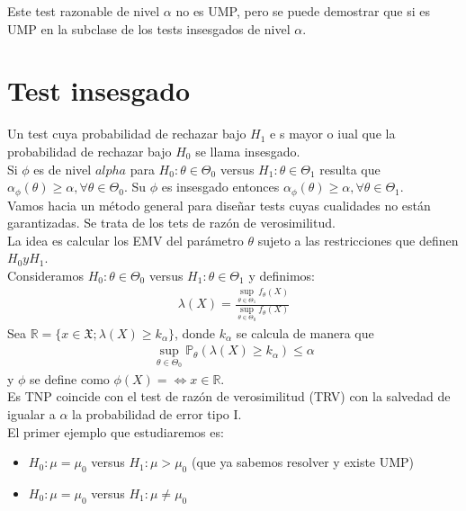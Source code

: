 \documentclass[10pt]{article}
\theoremstyle{plain}
\theoremstyle{definition}
\begin{document}
Este test razonable de nivel $\alpha$ no es UMP, pero se puede demostrar que si es UMP en la subclase de los tests insesgados de nivel $\alpha$.
\section{Test insesgado}
Un test cuya probabilidad de rechazar bajo $H_{1}$ e s mayor o iual que la probabilidad de rechazar bajo $H_{0}$ se llama insesgado.\\
Si $\phi$ es de nivel $alpha$ para $H_{0}: \theta \in \Theta_{0}$ versus $H_{1}: \theta \in \Theta_{1}$ resulta que $\alpha_{\phi}(\theta) \ge \alpha, \forall \theta \in \Theta_{0}$. Su $\phi$ es insesgado entonces $\alpha_{\phi}(\theta) \ge \alpha, \forall \theta \in \Theta_{1}$.\\

Vamos hacia un método general para diseñar tests cuyas cualidades no están garantizadas. Se trata de los tets de razón de verosimilitud.\\
La idea es calcular los EMV del parámetro $\theta$ sujeto a las restricciones que definen $H_{0} y H_{1}$.\\
Consideramos $H_{0}: \theta \in \Theta_{0}$ versus $H_{1}: \theta \in \Theta_{1}$ y definimos:
\begin{align*}
\lambda(X) = \frac{\sup_{\theta \in \Theta_{1}} f_{\theta}(X)}{\sup_{\theta \in \Theta_{0}} f_{\theta}(X)}
\end{align*}
Sea $\mathbb{R}=\{x\in\mathfrak{X}; \lambda(X) \ge k_{\alpha}\}$, donde $k_{\alpha}$ se calcula de manera que
\begin{align*}
\sup_{\theta \in \Theta_{0}} \mathbb{P}_{\theta}\left(\lambda(X) \ge k_{\alpha}\right) \le \alpha
\end{align*}
y $\phi$ se define como $\phi(X) = \Leftrightarrow x \in \mathbb{R}$.\\

Es TNP coincide con el test de razón de verosimilitud (TRV) con la salvedad de igualar a $\alpha$ la probabilidad de error tipo I.\\

El primer ejemplo que estudiaremos es:
\begin{itemize}
\item $H_{0}: \mu = \mu_{0}$ versus $H_{1}: \mu > \mu_{0}$ (que ya sabemos resolver y existe UMP)
\item $H_{0}: \mu = \mu_{0}$ versus $H_{1}: \mu \not =\mu_{0}$
\end{itemize}
\end{document}
